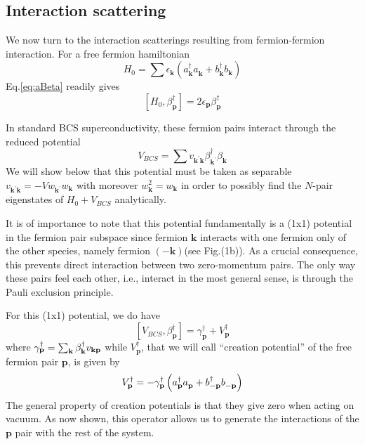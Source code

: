\documentclass[aps,prb,superscriptaddress,showpacs,reprint,lengthcheck]{revtex4}
\newcommand{\vk}{\ensuremath{\mathbf{k}}}
\newcommand{\vp}{\ensuremath{\mathbf{p}}}
\begin{document}
\subsection{Interaction scattering}

We now turn to the interaction scatterings resulting from fermion-fermion interaction. For a free fermion hamiltonian 
\begin{equation}  \label{eq:h0}
H_0=\sum{\epsilon_\vk\left(a^{\dagger}_{\mathbf{k} } a^{}_{\mathbf{k}
}+b^{\dagger}_{\mathbf{k} } b^{}_{\mathbf{k} }\right) }
\end{equation}
Eq.\eqref{eq:aBeta} readily gives 
\begin{equation}  \label{eq:betaH}
\left[H_0,\beta^{\dagger}_\vp\right]  =2\epsilon_\vp\beta^{\dagger}_\vp
\end{equation}

In  standard BCS superconductivity, these fermion pairs interact through the reduced potential
\begin{equation}  \label{eq:vbcs}
V_{BCS}=\sum{v_{\mathbf{k} ^{\prime}\mathbf{k} }\beta^{\dagger}_{\mathbf{k}
^{\prime}}\beta^{}_{\mathbf{k} }}
\end{equation}
We will show below that this potential must be taken as separable $v_{\mathbf{k} ^{\prime}\mathbf{k}}=-Vw_{\mathbf{k} ^{\prime} }w_\vk$ with moreover $w_\vk^2=w_\vk$ in order to possibly find the $N$-pair eigenstates of $H_0+V_{BCS}$ analytically.


It is of importance to note that this potential fundamentally is a (1x1) potential in the fermion pair subspace since fermion $\mathbf{k}$ 
interacts with one fermion only of the other
species, namely fermion $\left(-\mathbf{k} \right)$(see Fig.(1b)). As a crucial consequence, this prevents direct interaction between two zero-momentum pairs. The only way these pairs feel each other, i.e., interact in the most general sense, is through the Pauli exclusion principle. 


  For this (1x1)
potential, we do have 
\begin{equation}  \label{eq:vbeta}
\left[V_{BCS},\beta^{\dagger}_\vp\right] 
=\gamma^{\dagger}_\vp+V^{\dagger}_\vp
\end{equation}
where $\gamma^{\dagger}_\vp=\sum_\vk\beta^{\dagger}_\vk{}v_{%
\mathbf{k} \mathbf{p} }$ while $V^{\dagger}_\vp$, that we will call ``creation potential''  of the free fermion pair 
$\mathbf{p} $, is given by 
\begin{equation}  \label{eq:betaV}
V^{\dagger}_\vp=-{\gamma^{\dagger}_\vp}\left(a^{\dagger}_{\mathbf{p} }a^{}_{%
\mathbf{p} }+b^{\dagger}_{-\mathbf{p} }b^{}_{-\mathbf{p} }\right) 
\end{equation}
The general property of creation potentials is that they give zero when acting on vacuum. As now shown, this operator allows us to generate the interactions of the $\vp$ pair with the rest of the system.
\end{document}
